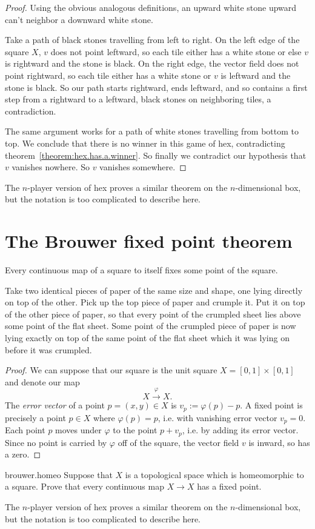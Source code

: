 \begin{proof}
Using the obvious analogous definitions, an upward white stone upward can't neighbor a downward white stone.
 
Take a path of black stones travelling from left to right.
On the left edge of the square \(X\), \(v\) does not point leftward, so each tile either has a white stone or else \(v\) is rightward and the stone is black.
On the right edge, the vector field does not point rightward, so each tile either has a white stone or \(v\) is leftward and the stone is black.
So our path starts rightward, ends leftward, and so contains a first step from a rightward to a leftward, black stones on neighboring tiles, a contradiction.

The same argument works for a path of white stones travelling from bottom to top.
We conclude that there is no winner in this game of hex, contradicting theorem~\vref{theorem:hex.has.a.winner}.
So finally we contradict our hypothesis that \(v\) vanishes nowhere.
So \(v\) vanishes somewhere.
\end{proof}
The \(n\)-player version of hex proves a similar theorem on the \(n\)-dimensional box, but the notation is too complicated to describe here.
\section{The Brouwer fixed point theorem}
\begin{theorem}
Every continuous map of a square to itself fixes some point of the square.
\end{theorem}
Take two identical pieces of paper%
of the same size and shape, one lying directly on top of the other.
Pick up the top piece of paper and crumple it. 
Put it on top of the other piece of paper, so that every point of the crumpled sheet lies above some point of the flat sheet.
Some point of the crumpled piece of paper is now lying exactly on top of the same point of the flat sheet which it was lying on before it was crumpled.
\begin{proof}
We can suppose that our square is the unit square \(X=[0,1]\times[0,1]\) and denote our map
\[
X\xrightarrow{\varphi}X.
\]
The \emph{error vector} of a point \(p=(x,y)\in X\) is \(v_p:=\varphi(p)-p\).
A fixed point is precisely a point \(p\in X\) where \(\varphi(p)=p\), i.e. with vanishing error vector \(v_p=0\).
Each point \(p\) moves under \(\varphi\) to the point \(p+v_p\), i.e. by adding its error vector.
Since no point is carried by \(\varphi\) off of the square, the vector field \(v\) is inward, so has a zero.
\end{proof}
\begin{problem}{brouwer.homeo}
Suppose that \(X\) is a topological space which is homeomorphic to a square.
Prove that every continuous map \(X\to X\) has a fixed point.
\end{problem}
The \(n\)-player version of hex proves a similar theorem on the \(n\)-dimensional box, but the notation is too complicated to describe here.

